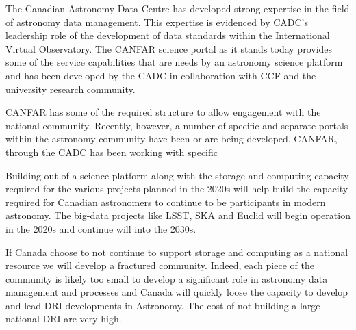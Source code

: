 \documentclass[11pt]{article}
\begin{document}
\begin{lrptextbox} 
The Canadian Astronomy Data Centre has developed strong expertise in the field of  astronomy data management. This expertise is evidenced by CADC's leadership role of the development of data standards within the International Virtual Observatory.  The CANFAR science portal as it stands today provides some of the service capabilities that are needs by an astronomy science platform and has been developed by the CADC in collaboration with CCF and the university research community. 
\end{lrptextbox}

\begin{lrptextbox} 
CANFAR has some of the required structure to allow engagement with the national community.  Recently, however, a number of  specific and separate portals within the astronomy community have been or are being developed. 
CANFAR, through the CADC has been working with specific 
\end{lrptextbox}


\begin{lrptextbox} 
Building out of a science platform along with the storage and computing capacity required for the various projects planned in the 2020s will help build the capacity required for Canadian astronomers to continue to be participants in modern astronomy.  The big-data projects like LSST, SKA and Euclid will begin operation in the 2020s and continue will into the 2030s.

\end{lrptextbox}

\begin{lrptextbox} 
If Canada choose to not continue to support storage and computing as a national resource we will develop a fractured community.  Indeed, each piece of the community is likely too small to develop a significant role in astronomy data management and processes and Canada will quickly loose the capacity to develop and lead DRI developments in Astronomy.  The cost of not building a large national DRI are very high.

\end{lrptextbox}
\end{document}
